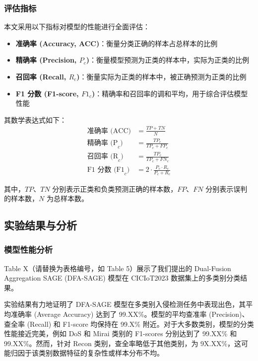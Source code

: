 \documentclass{article}
\begin{document}
\subsubsection{评估指标}
本文采用以下指标对模型的性能进行全面评估：
\begin{itemize}
    \item \textbf{准确率 (Accuracy, ACC)}：衡量分类正确的样本占总样本的比例
    \item \textbf{精确率 (Precision, $P_c$)}：衡量模型预测为正类的样本中，实际为正类的比例
    \item \textbf{召回率 (Recall, $R_c$)}：衡量实际为正类的样本中，被正确预测为正类的比例
    \item \textbf{F1 分数 (F1-score, $F1_c$)}：精确率和召回率的调和平均，用于综合评估模型性能
\end{itemize}

其数学表达式如下：
\begin{align}
\text{准确率 (ACC)} &= \frac{TP + TN}{N} \label{eq:accuracy} \\
\text{精确率 (P}_c\text{)} &= \frac{TP_c}{TP_c + FP_c} \label{eq:precision} \\
\text{召回率 (R}_c\text{)} &= \frac{TP_c}{TP_c + FN_c} \label{eq:recall} \\
\text{F1 分数 (F1}_c\text{)} &= 2 \cdot \frac{P_c \cdot R_c}{P_c + R_c} \label{eq:f1score}
\end{align}

其中，$TP$、$TN$ 分别表示正类和负类预测正确的样本数，$FP$、$FN$ 分别表示误判的样本数，$N$ 为总样本数。
\subsection{实验结果与分析}

\subsubsection{模型性能分析}

Table X（请替换为表格编号，如 Table 5）展示了我们提出的 Dual-Fusion Aggregation SAGE (DFA-SAGE) 模型在 CICIoT2023 数据集上的多类别分类结果。

实验结果有力地证明了 DFA-SAGE 模型在多类别入侵检测任务中表现出色，其平均准确率 (Average Accuracy) 达到了 99.XX\%。模型的平均查准率 (Precision)、查全率 (Recall) 和 F1-score 均保持在 99.X\% 附近。对于大多数类别，模型的分类性能接近完美，例如 DoS 和 Mirai 类别的 F1-scores 分别达到了 99.XX\% 和 99.XX\%。然而，针对 Recon 类别，查全率略低于其他类别，为 9X.XX\%，这可能归因于该类别数据特征的复杂性或样本分布不均。
\end{document}
